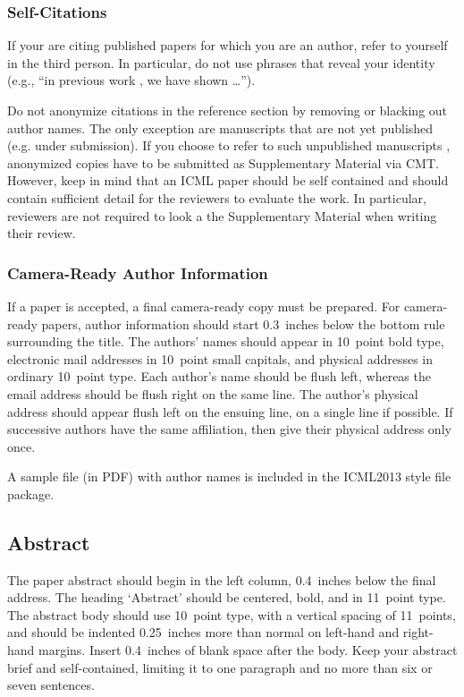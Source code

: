\documentclass{article}
\begin{document}
\subsubsection{Self-Citations}

If your are citing published papers for which you are an author, refer
to yourself in the third person. In particular, do not use phrases
that reveal your identity (e.g., ``in previous work \cite{langley00}, we 
have shown \ldots'').

Do not anonymize citations in the reference section by removing or
blacking out author names. The only exception are manuscripts that are
not yet published (e.g. under submission). If you choose to refer to
such unpublished manuscripts \cite{anonymous}, anonymized copies have 
to be submitted
as Supplementary Material via CMT. However, keep in mind that an ICML
paper should be self contained and should contain sufficient detail
for the reviewers to evaluate the work. In particular, reviewers are
not required to look a the Supplementary Material when writing their
review.

\subsubsection{Camera-Ready Author Information}
\label{final author}

If a paper is accepted, a final camera-ready copy must be prepared.
%
For camera-ready papers, author information should start 0.3~inches
below the bottom rule surrounding the title. The authors' names should
appear in 10~point bold type, electronic mail addresses in 10~point
small capitals, and physical addresses in ordinary 10~point type.
Each author's name should be flush left, whereas the email address
should be flush right on the same line. The author's physical address
should appear flush left on the ensuing line, on a single line if
possible. If successive authors have the same affiliation, then give
their physical address only once.

A sample file (in PDF) with author names is included in the ICML2013 
style file package.

\subsection{Abstract}

The paper abstract should begin in the left column, 0.4~inches below
the final address. The heading `Abstract' should be centered, bold,
and in 11~point type. The abstract body should use 10~point type, with
a vertical spacing of 11~points, and should be indented 0.25~inches
more than normal on left-hand and right-hand margins. Insert
0.4~inches of blank space after the body. Keep your abstract brief and 
self-contained,
limiting it to one paragraph and no more than six or seven sentences.
\end{document}
